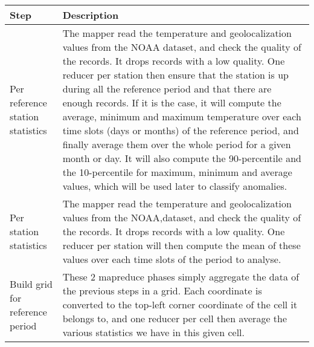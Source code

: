 \documentclass[12pt]{article}
\begin{document}
\begin{table}[h]
\begin{tabular}{|l|l|}
\hline
\textbf{Step}                     & \textbf{Description}                                                                                                                                                                                                                                                                                                                                                                                                                                                                                                                                                                                                                                                             \\ \hline
Per reference station statistics  & The mapper read the temperature and geolocalization values from the NOAA dataset, and check the quality of the records. It drops records with a low quality. One reducer per station then ensure that the station is up during all the reference period and that there are enough records. If it is the case, it will compute the average, minimum and maximum temperature over each time slots (days or months) of the reference period, and finally average them over the whole period for a given month or day. It will also compute the 90-percentile and the 10-percentile for maximum, minimum and average values, which will be used later to classify anomalies. \\ \hline
Per station statistics            & The mapper read the temperature and geolocalization values from the NOAA,dataset, and check the quality of the records. It drops records with a low quality. One reducer per station will then compute the mean of these values over each time slots of the period to analyse.                                                                                                                                                                                                                                                                                                                                                                                           \\ \hline
Build grid for reference period   & \multirow{2}{*}{These 2 mapreduce phases simply aggregate the data of the previous steps in a grid. Each coordinate is converted to the top-left corner coordinate of the cell it belongs to, and one reducer per cell then average the various statistics we have in this given cell.}                                                                                                                                                                                                                                                                                                                                                                                  \\ \cline{1-1}

\end{tabular}
\end{table}
\end{document}
